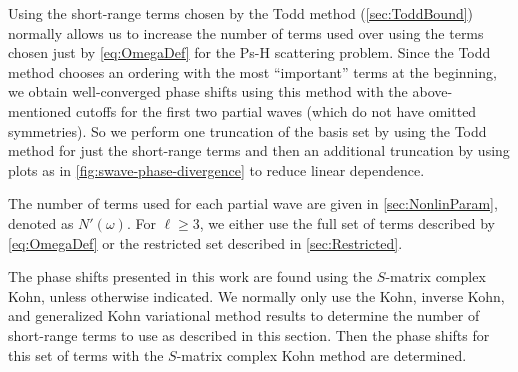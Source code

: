 \documentclass[Dissertation.tex]{subfiles}
\begin{document}
Using the short-range terms chosen by the Todd method (\cref{sec:ToddBound})
normally allows us to increase the number of terms used over using the terms
chosen just by \cref{eq:OmegaDef} for the Ps-H scattering problem.
Since the Todd method chooses an ordering with the most ``important'' terms 
at the beginning, we obtain well-converged phase shifts using this method with
the above-mentioned cutoffs for the first two partial waves (which do not 
have omitted symmetries). So we perform one truncation of the basis set by
using the Todd method for just the short-range terms and then an additional 
truncation by using plots as in \cref{fig:swave-phase-divergence} to reduce
linear dependence.

The number of terms used for each partial wave are given in \cref{sec:NonlinParam},
denoted as $N'(\omega)$. For $\ell \geq 3$, we either use the full set of
terms described by \cref{eq:OmegaDef} or the restricted set described in
\cref{sec:Restricted}.

The phase shifts presented in this work are found using the $S$-matrix 
complex Kohn, unless otherwise indicated. We normally only use the Kohn, 
inverse Kohn, and generalized Kohn variational method results to determine 
the number of short-range terms to use as described in this section. Then the 
phase shifts for this set of terms with the $S$-matrix complex Kohn method 
are determined.

\end{document}
